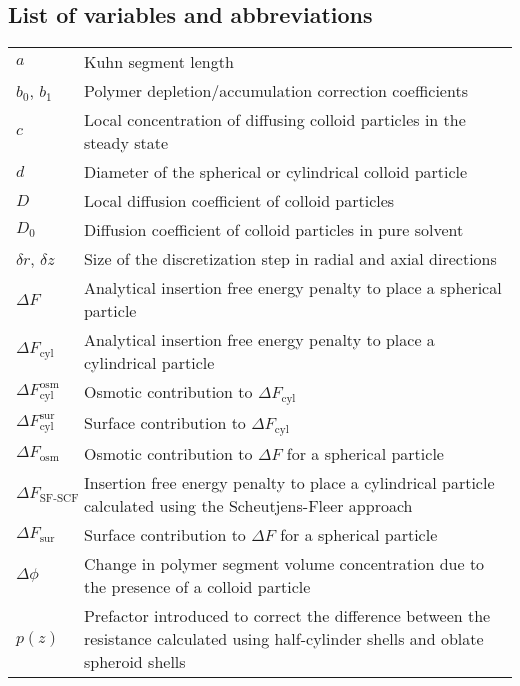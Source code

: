 \documentclass[10pt, a4paper, twocolumn]{article}
\newcommand{\todo}[1]{\pdfcomment{#1}} %
\begin{document}
\onecolumn
\subsection*{List of variables and abbreviations}
\todo{TO BE REVISED}

%
\begin{tabularx}{\linewidth}{l X}
    $a$ & Kuhn segment length \\
    $b_0$, $b_1$ & Polymer depletion/accumulation correction coefficients \\
    $c$ & Local concentration of diffusing colloid particles in the steady state \\
    $d$ & Diameter of the spherical or cylindrical colloid particle \\
    $D$ & Local diffusion coefficient of colloid particles \\
    $D_0$ & Diffusion coefficient of colloid particles in pure solvent \\
    $\delta r$, $\delta z$ & Size of the discretization step in radial and axial directions \\
    $\Delta F$ & Analytical insertion free energy penalty to place a spherical particle \\
    $\Delta F_{\text{cyl}}$ & Analytical insertion free energy penalty to place a cylindrical particle \\
    $\Delta F_{\text{cyl}}^{\text{osm}}$ & Osmotic contribution to $\Delta F_{\text{cyl}}$ \\
    $\Delta F_{\text{cyl}}^{\text{sur}}$ & Surface contribution to $\Delta F_{\text{cyl}}$ \\
    $\Delta F_{\text{osm}}$ & Osmotic contribution to $\Delta F$ for a spherical particle\\
    $\Delta F_{\text{SF-SCF}}$ & Insertion free energy penalty to place a cylindrical particle calculated using the Scheutjens-Fleer approach \\
    $\Delta F_{\text{sur}}$ & Surface contribution to $\Delta F$ for a spherical particle\\
    $\Delta \phi$ & Change in polymer segment volume concentration due to the presence of a colloid particle \\
    $p(z)$ & Prefactor introduced to correct the difference between the resistance calculated using half-cylinder shells and oblate spheroid shells \\

\end{tabularx}
\end{document}
